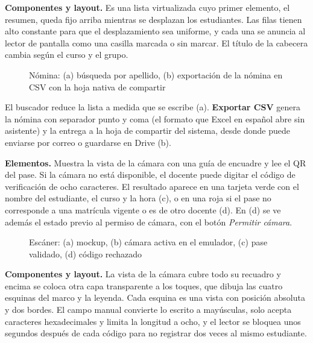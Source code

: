 \textbf{Componentes y layout.} Es una lista virtualizada cuyo primer elemento, el resumen, queda fijo arriba mientras se desplazan los estudiantes. Las filas tienen alto constante para que el desplazamiento sea uniforme, y cada una se anuncia al lector de pantalla como una casilla marcada o sin marcar. El título de la cabecera cambia según el curso y el grupo.

\begin{figure}[!htbp]
\centering
{}
\caption{Nómina: (a) búsqueda por apellido, (b) exportación de la nómina en CSV con la hoja nativa de compartir}
\label{fig:x08}
\end{figure}

El buscador reduce la lista a medida que se escribe (a). \textbf{Exportar CSV} genera la nómina con separador punto y coma (el formato que Excel en español abre sin asistente) y la entrega a la hoja de compartir del sistema, desde donde puede enviarse por correo o guardarse en Drive (b).


\textbf{Elementos.} Muestra la vista de la cámara con una guía de encuadre y lee el QR del pase. Si la cámara no está disponible, el docente puede digitar el código de verificación de ocho caracteres. El resultado aparece en una tarjeta verde con el nombre del estudiante, el curso y la hora (c), o en una roja si el pase no corresponde a una matrícula vigente o es de otro docente (d). En (d) se ve además el estado previo al permiso de cámara, con el botón \textit{Permitir cámara}.

\begin{figure}[!htbp]
\centering
{}
\caption{Escáner: (a) mockup, (b) cámara activa en el emulador, (c) pase validado, (d) código rechazado}
\label{fig:i09}
\end{figure}

\textbf{Componentes y layout.} La vista de la cámara cubre todo su recuadro y encima se coloca otra capa transparente a los toques, que dibuja las cuatro esquinas del marco y la leyenda. Cada esquina es una vista con posición absoluta y dos bordes. El campo manual convierte lo escrito a mayúsculas, solo acepta caracteres hexadecimales y limita la longitud a ocho, y el lector se bloquea unos segundos después de cada código para no registrar dos veces al mismo estudiante.

